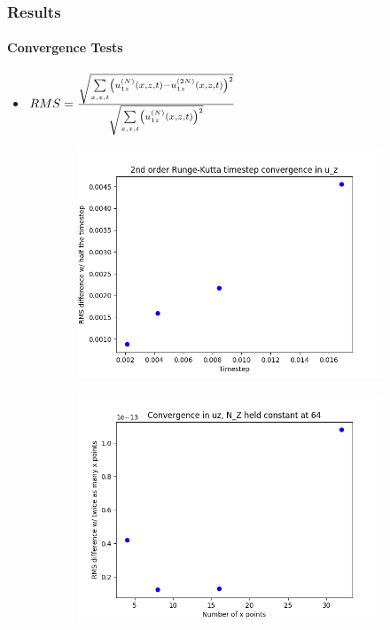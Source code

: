 \documentclass[dvipsnames]{beamer}
\DeclarePairedDelimiter\p{\lparen}{\rparen}
\begin{document}
\begin{frame}
    \frametitle{Results}
    \framesubtitle{Convergence Tests}

    \begin{itemize}
        \item $RMS = \frac{\sqrt{\sum\limits_{x, z, t} \p*{u_{1z}^{(N)}(x, z, t)
            - u_{1z}^{(2N)}(x, z, t)}^2}}{\sqrt{
            \sum\limits_{x, z, t} \p*{u_{1z}^{(N)}(x, z, t)}^2}}$
    \end{itemize}
    \begin{figure}[!h]
        \centering
        \begin{subfigure}{0.3\textwidth}
            \centering
            \includegraphics[width=\textwidth]{../sims/2d_strat_conv/t_conv.png}
        \end{subfigure}
        \begin{subfigure}{0.3\textwidth}
            \centering
            \includegraphics[width=\textwidth]{../sims/2d_strat_conv/x_conv.png}
        \end{subfigure}


\end{figure}
\end{frame}
\end{document}
